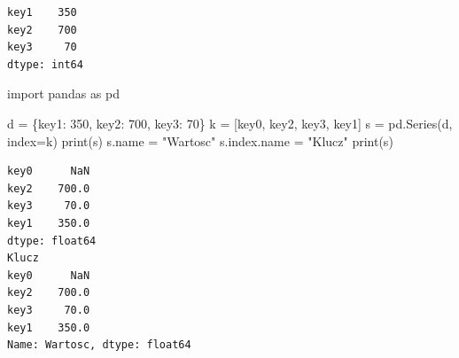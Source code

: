 \documentclass[
  polish,
  letterpaper,
  DIV=11,
  numbers=noendperiod]{scrreprt}
\newenvironment{Shaded}{\begin{snugshade}}{\end{snugshade}}
\newcommand{\BuiltInTok}[1]{\textcolor[rgb]{0.00,0.23,0.31}{#1}}
\newcommand{\DecValTok}[1]{\textcolor[rgb]{0.68,0.00,0.00}{#1}}
\newcommand{\ImportTok}[1]{\textcolor[rgb]{0.00,0.46,0.62}{#1}}
\newcommand{\NormalTok}[1]{\textcolor[rgb]{0.00,0.23,0.31}{#1}}
\newcommand{\OperatorTok}[1]{\textcolor[rgb]{0.37,0.37,0.37}{#1}}
\newcommand{\StringTok}[1]{\textcolor[rgb]{0.13,0.47,0.30}{#1}}
\begin{document}
\begin{verbatim}
key1    350
key2    700
key3     70
dtype: int64
\end{verbatim}

\begin{Shaded}
\begin{Highlighting}[]
\ImportTok{import}\NormalTok{ pandas }\ImportTok{as}\NormalTok{ pd}

\NormalTok{d }\OperatorTok{=}\NormalTok{ \{}\StringTok{\textquotesingle{}key1\textquotesingle{}}\NormalTok{: }\DecValTok{350}\NormalTok{, }\StringTok{\textquotesingle{}key2\textquotesingle{}}\NormalTok{: }\DecValTok{700}\NormalTok{, }\StringTok{\textquotesingle{}key3\textquotesingle{}}\NormalTok{: }\DecValTok{70}\NormalTok{\}}
\NormalTok{k }\OperatorTok{=}\NormalTok{ [}\StringTok{\textquotesingle{}key0\textquotesingle{}}\NormalTok{, }\StringTok{\textquotesingle{}key2\textquotesingle{}}\NormalTok{, }\StringTok{\textquotesingle{}key3\textquotesingle{}}\NormalTok{, }\StringTok{\textquotesingle{}key1\textquotesingle{}}\NormalTok{]}
\NormalTok{s }\OperatorTok{=}\NormalTok{ pd.Series(d, index}\OperatorTok{=}\NormalTok{k)}
\BuiltInTok{print}\NormalTok{(s)}
\NormalTok{s.name }\OperatorTok{=} \StringTok{"Wartosc"}
\NormalTok{s.index.name }\OperatorTok{=} \StringTok{"Klucz"}
\BuiltInTok{print}\NormalTok{(s)}
\end{Highlighting}
\end{Shaded}

\begin{verbatim}
key0      NaN
key2    700.0
key3     70.0
key1    350.0
dtype: float64
Klucz
key0      NaN
key2    700.0
key3     70.0
key1    350.0
Name: Wartosc, dtype: float64
\end{verbatim}
\end{document}
